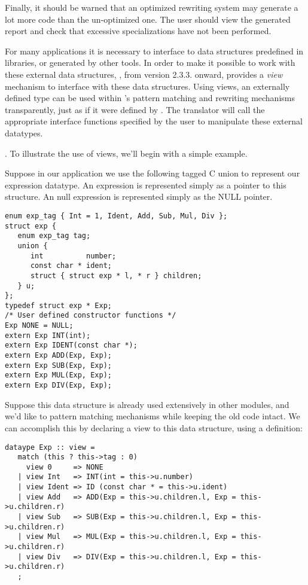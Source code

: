 Finally, it should be warned that an optimized rewriting system  
may generate a lot more code than the un-optimized one.  The user should
view the generated report and check that excessive specializations have not 
been performed.

 \label{sec:views}

   For many applications it is necessary to interface \Prop{} to 
data structures predefined in libraries, or generated by other tools.
In order to make it possible to work with these external data structures,
\Prop{}, from version 2.3.3. onward, provides a {\em view} mechanism to
interface with these data structures.  Using views, an externally defined
type can be used within \Prop's pattern matching and rewriting
mechanisms transparently, just as if it were defined by \Prop. 
The \Prop{} translator will call the
appropriate interface functions specified by the user to manipulate
these external datatypes.

 \label{sec:tagged-union}.
To illustrate the use of views, we'll begin with a simple example.

Suppose in our application we use the following tagged C union to
represent our expression datatype.  An expression is represented
simply as a pointer to this structure.  An null expression is
represented simply as the NULL pointer.  

\begin{verbatim}
enum exp_tag { Int = 1, Ident, Add, Sub, Mul, Div };
struct exp {
   enum exp_tag tag;
   union {
      int          number;
      const char * ident;
      struct { struct exp * l, * r } children;
   } u;
};
typedef struct exp * Exp;
/* User defined constructor functions */
Exp NONE = NULL;
extern Exp INT(int);
extern Exp IDENT(const char *);
extern Exp ADD(Exp, Exp);
extern Exp SUB(Exp, Exp);
extern Exp MUL(Exp, Exp);
extern Exp DIV(Exp, Exp);
\end{verbatim}

Suppose this data structure is already used extensively in other 
modules, and we'd like to \Prop{} pattern matching mechanisms while keeping 
the old code intact.  We can accomplish this by declaring a
view to this data structure, using a 
definition:
\begin{verbatim}
dataype Exp :: view =
   match (this ? this->tag : 0)
     view 0     => NONE
   | view Int   => INT(int = this->u.number)
   | view Ident => ID (const char * = this->u.ident)
   | view Add   => ADD(Exp = this->u.children.l, Exp = this->u.children.r)
   | view Sub   => SUB(Exp = this->u.children.l, Exp = this->u.children.r)
   | view Mul   => MUL(Exp = this->u.children.l, Exp = this->u.children.r)
   | view Div   => DIV(Exp = this->u.children.l, Exp = this->u.children.r)
   ;
\end{verbatim}

